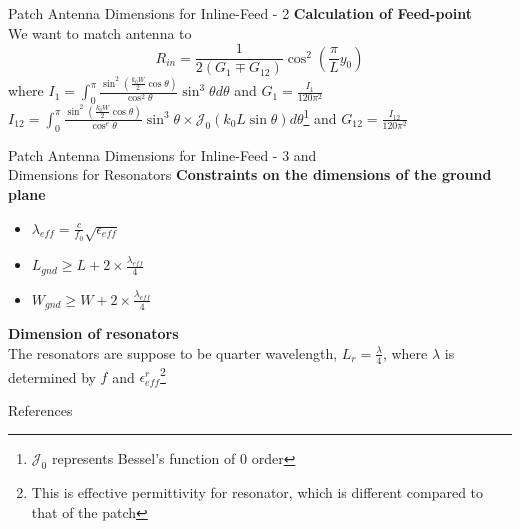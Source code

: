\documentclass{beamer}
\begin{document}
\begin{frame}{Patch Antenna Dimensions for Inline-Feed - 2}
    \textbf{Calculation of Feed-point}\\
    We want to match antenna to \[\displaystyle R_{in} = \frac{1}{2(G_{1}\mp G_{12})}\cos^2\left(\frac{\pi}{L}y_0\right)\]
    where
    \(\displaystyle I_1 = \int_0^{\pi}\frac{\sin^2\left(\frac{k_0W}{2}\cos\theta\right)}{\cos^2\theta}\sin^3\theta d\theta\) and \(G_1 = \frac{I_1}{120\pi^2}\)\\
    \(
    \displaystyle I_{12}=\int_0^\pi \frac{\sin^2\left(\frac{k_0W}{2}\cos\theta\right)}{\cos^e\theta}\sin^3\theta\times \mathcal{J}_0(k_0L\sin\theta) d\theta
    \)\footnote{\(\mathcal{J}_0\) represents Bessel's function of 0 order} and \(G_{12}=\frac{I_{12}}{120\pi^2}\)


\end{frame}

\begin{frame}{Patch Antenna Dimensions for Inline-Feed - 3 and \\Dimensions for Resonators}
    \textbf{Constraints on the dimensions of the ground plane}
    \begin{itemize}
        \item \(\displaystyle \lambda_{eff} = \frac{c}{f_0}\sqrt{\epsilon_{eff}} \)
        \item \(\displaystyle L_{gnd} \ge L + 2\times\frac{\lambda_{eff}}{4} \)
        \item \(\displaystyle W_{gnd} \ge W + 2\times\frac{\lambda_{eff}}{4} \)
    \end{itemize}
    \textbf{Dimension of resonators}\\
    The resonators are suppose to be quarter wavelength, \(L_r=\frac{\lambda}{4}\), where \(\lambda\) is determined by \(f\) and \(\epsilon_{eff}^{r}\)\footnote{This is effective permittivity for resonator, which is different compared to that of the patch}
\end{frame}





\begin{frame}[allowframebreaks]{References}
  \nocite{*}
  
  
\end{frame} 
\end{document}
